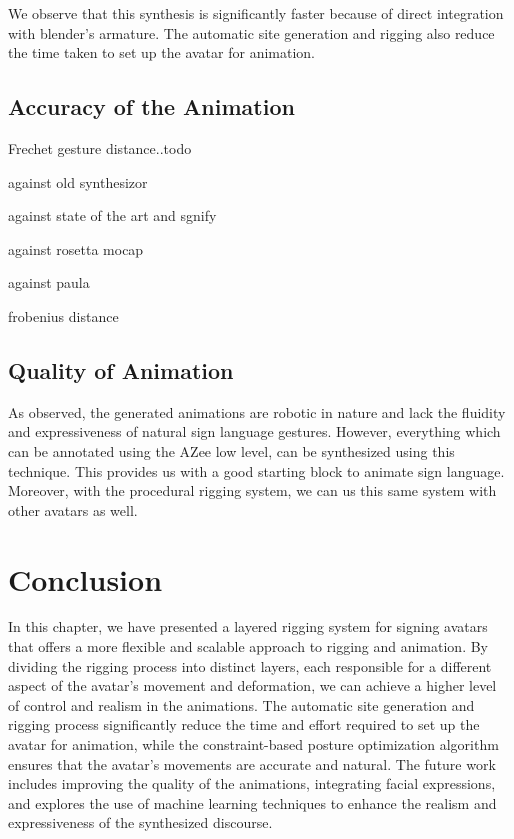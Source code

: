 \documentclass[../../main.tex]{subfiles}
\begin{document}
We observe that this synthesis is significantly faster because of direct integration with blender's armature. The automatic site generation and rigging also reduce the time taken to set up the avatar for animation.

\subsection{Accuracy of the Animation}
\label{ch:rigging_layers:evaluation:accuracy}

Frechet gesture distance..todo

against old synthesizor

against state of the art and sgnify

against rosetta mocap

against paula

frobenius distance

\subsection{Quality of Animation}
\label{ch:rigging_layers:evaluation:quality}

As observed, the generated animations are robotic in nature and lack the fluidity and expressiveness of natural sign language gestures. However, everything which can be annotated using the AZee low level, can be synthesized using this technique. This provides us with a good starting block to animate sign language. Moreover, with the procedural rigging system, we can us this same system with other avatars as well.

\section{Conclusion}
\label{ch:rigging_layers:conclusion}

In this chapter, we have presented a layered rigging system for signing avatars that offers a more flexible and scalable approach to rigging and animation. By dividing the rigging process into distinct layers, each responsible for a different aspect of the avatar's movement and deformation, we can achieve a higher level of control and realism in the animations. The automatic site generation and rigging process significantly reduce the time and effort required to set up the avatar for animation, while the constraint-based posture optimization algorithm ensures that the avatar's movements are accurate and natural. The future work includes improving the quality of the animations, integrating facial expressions, and explores the use of machine learning techniques to enhance the realism and expressiveness of the synthesized discourse.
\end{document}
